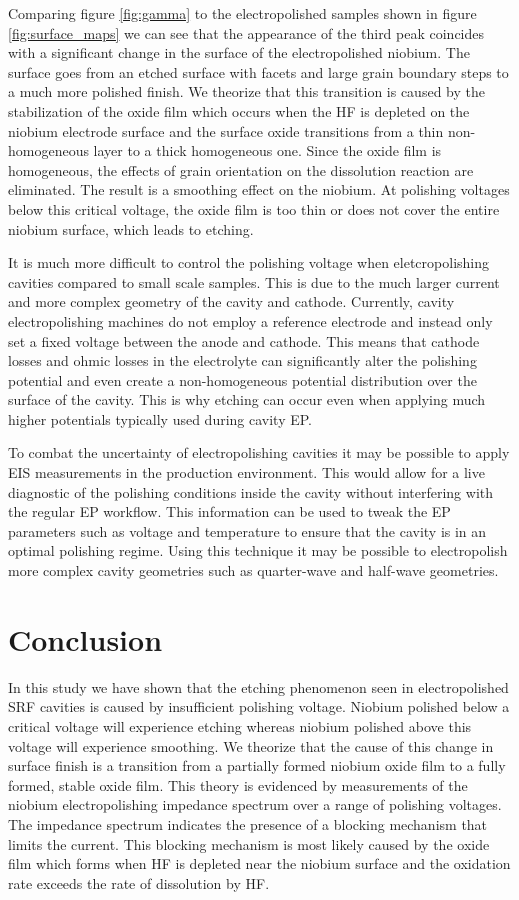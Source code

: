 \documentclass{revtex4-2}
\begin{document}
Comparing figure \ref{fig:gamma} to the electropolished samples shown in figure \ref{fig:surface_maps} we can see that the appearance of the third peak coincides with a significant change in the surface of the electropolished niobium. The surface goes from an etched surface with facets and large grain boundary steps to a much more polished finish. We theorize that this transition is caused by the stabilization of the oxide film which occurs when the HF is depleted on the niobium electrode surface and the surface oxide transitions from a thin non-homogeneous layer to a thick homogeneous one. Since the oxide film is homogeneous, the effects of grain orientation on the dissolution reaction are eliminated. The result is a smoothing effect on the niobium. At polishing voltages below this critical voltage, the oxide film is too thin or does not cover the entire niobium surface, which leads to etching.

It is much more difficult to control the polishing voltage when eletcropolishing cavities compared to small scale samples. This is due to the much larger current and more complex geometry of the cavity and cathode. Currently, cavity electropolishing machines do not employ a reference electrode and instead only set a fixed voltage between the anode and cathode. This means that cathode losses and ohmic losses in the electrolyte can significantly alter the polishing potential and even create a non-homogeneous potential distribution over the surface of the cavity. This is why etching can occur even when applying much higher potentials typically used during cavity EP.

To combat the uncertainty of electropolishing cavities it may be possible to apply EIS measurements in the production environment. This would allow for a live diagnostic of the polishing conditions inside the cavity without interfering with the regular EP workflow. This information can be used to tweak the EP parameters such as voltage and temperature to ensure that the cavity is in an optimal polishing regime. Using this technique it may be possible to electropolish more complex cavity geometries such as quarter-wave and half-wave geometries.



\section{Conclusion}
\label{sec:org57282ed}
In this study we have shown that the etching phenomenon seen in electropolished SRF cavities is caused by insufficient polishing voltage. Niobium polished below a critical voltage will experience etching whereas niobium polished above this voltage will experience smoothing. We theorize that the cause of this change in surface finish is a transition from a partially formed niobium oxide film to a fully formed, stable oxide film. This theory is evidenced by measurements of the niobium electropolishing impedance spectrum over a range of polishing voltages. The impedance spectrum indicates the presence of a blocking mechanism that limits the current. This blocking mechanism is most likely caused by the oxide film which forms when HF is depleted near the niobium surface and the oxidation rate exceeds the rate of dissolution by HF.
\end{document}
